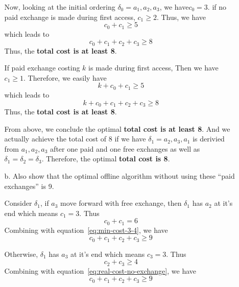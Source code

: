 \documentclass[12pt]{article}
\begin{document}
\begin{enumerate}
\begin{itemize}
Now, looking at the initial ordering $\delta_{0} = a_{1},a_{2},a_{3}$, we have$c_{0} = 3$. if no paid exchange is made during first access, $c_{1} \geq 2$. Thus, we have
\begin{equation} \label{eq:real-cost-no-exchange}
c_{0} + c_{1} \geq 5
\end{equation}
which leads to
\begin{equation}
c_{0} + c_{1} + c_{2} + c_{3} \geq 8
\end{equation}
Thus, the \textbf{total cost is at least 8}.

If paid exchange costing $k$ is made during first access, Then we have $c_{1} \geq 1$. Therefore, we easily have
\begin{equation} \label{eq:real-cost-pay}
k + c_{0} + c_{1} \geq 5
\end{equation}
which leads to
\begin{equation}
k + c_{0} + c_{1} + c_{2} + c_{3} \geq 8
\end{equation}
Thus, the \textbf{total cost is at least 8}.

From above, we conclude the optimal \textbf{total cost is at least 8}. And we actually achieve the total cost of 8 if we have $\delta_{1} = a_{2},a_{3},a_{1}$ is derivied from $a_{1},a_{2},a_{3}$ after one paid and one free exchanges as well as $\delta_{1} = \delta_{2} = \delta_{3}$. Therefore, the optimal \textbf{total cost is 8}.

\item[b.] Also show that the optimal offline algorithm without using these “paid exchanges” is 9.

Consider $\delta_{1}$, if $a_{3}$ move forward with free exchange, then $\delta_{1}$ has $a_{2}$ at it's end which means $c_{1} = 3$. Thus
\begin{equation} \label{eq:real-cost-move}
c_{0} + c_{1} = 6
\end{equation}
Combining with equation~\ref{eq:min-cost-3-4}, we have
\begin{equation}
c_{0} + c_{1} + c_{2} + c_{3} \geq 9
\end{equation}

Otherwise, $\delta_{1}$ has $a_{3}$ at it's end which means $c_{3} = 3$. Thus
\begin{equation} \label{eq:real-cost-3-4}
c_{2} + c_{3} \geq 4
\end{equation}
Combining with equation~\ref{eq:real-cost-no-exchange}, we have
\begin{equation}
c_{0} + c_{1} + c_{2} + c_{3} \geq 9
\end{equation}


\end{itemize}
\end{enumerate}
\end{document}
